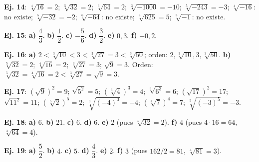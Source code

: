 \documentclass[11pt, letterpaper]{article}
\begin{document}
\clearpage

\begin{tcolorbox}[answerbox, title={Bloque D — Raíz enésima}]

\noindent\textbf{Ej. 14}: $\sqrt[4]{16}=2$; $\sqrt[5]{32}=2$; $\sqrt[6]{64}=2$; $\sqrt[3]{-1000}=-10$; $\sqrt[5]{-243}=-3$; $\sqrt[4]{-16}$: no existe; $\sqrt[5]{-32}=-2$; $\sqrt[6]{-64}$: no existe; $\sqrt[4]{625}=5$; $\sqrt[8]{-1}$: no existe.

\medskip

\noindent\textbf{Ej. 15}: \textbf{a)} $\dfrac{4}{3}$. \textbf{b)} $\dfrac{1}{2}$. \textbf{c)} $-\dfrac{5}{6}$. \textbf{d)} $\dfrac{3}{2}$. \textbf{e)} $0{,}3$. \textbf{f)} $-0{,}2$.

\medskip

\noindent\textbf{Ej. 16}: \textbf{a)} $2<\sqrt[3]{10}<3<\sqrt[3]{27}=3<\sqrt[3]{50}$; orden: $2, \sqrt[3]{10}, 3, \sqrt[3]{50}$. \textbf{b)} $\sqrt[5]{32}=2$; $\sqrt[4]{16}=2$; $\sqrt[3]{27}=3$; $\sqrt{9}=3$. Orden: $\sqrt[5]{32}=\sqrt[4]{16}=2<\sqrt[3]{27}=\sqrt{9}=3$.
\end{tcolorbox}

\medskip

\begin{tcolorbox}[answerbox, title={Bloque E — Relación inversa y propiedades}]

\noindent\textbf{Ej. 17}: $(\sqrt{9})^2=9$; $\sqrt{5^2}=5$; $(\sqrt[3]{4})^3=4$; $\sqrt[3]{6^3}=6$; $(\sqrt{17})^2=17$; $\sqrt{11^2}=11$; $(\sqrt[5]{2})^5=2$; $\sqrt[3]{(-4)^3}=-4$; $(\sqrt[4]{7})^4=7$; $\sqrt[5]{(-3)^5}=-3$.

\medskip

\noindent\textbf{Ej. 18}: \textbf{a)} $6$. \textbf{b)} $21$. \textbf{c)} $6$. \textbf{d)} $6$. \textbf{e)} $2$ (pues $\sqrt[5]{32}=2$). \textbf{f)} $4$ (pues $4\cdot16=64$, $\sqrt[3]{64}=4$).

\medskip

\noindent\textbf{Ej. 19}: \textbf{a)} $\dfrac{5}{2}$. \textbf{b)} $4$. \textbf{c)} $5$. \textbf{d)} $\dfrac{4}{3}$. \textbf{e)} $2$. \textbf{f)} $3$ (pues $162/2=81$, $\sqrt[4]{81}=3$).
\end{tcolorbox}

\medskip
\end{document}
